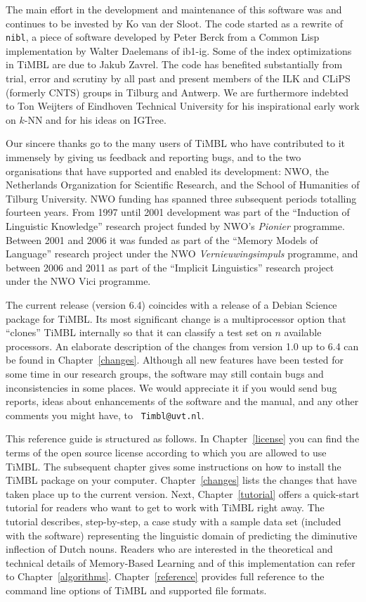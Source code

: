 \documentclass{book}
\begin{document}
The main effort in the development and maintenance of this software
was and continues to be invested by Ko van der Sloot. The code started
as a rewrite of {\tt nibl}, a piece of software developed by Peter
Berck from a Common Lisp implementation by Walter Daelemans of {\sc
  ib1-ig}. Some of the index optimizations in TiMBL are due to Jakub
Zavrel. The code has benefited substantially from trial, error and
scrutiny by all past and present members of the ILK and CLiPS
(formerly CNTS) groups in Tilburg and Antwerp. We are furthermore
indebted to Ton Weijters of Eindhoven Technical University for his
inspirational early work on $k$-NN and for his ideas on {\sc IGTree}.

Our sincere thanks go to the many users of TiMBL who have contributed
to it immensely by giving us feedback and reporting bugs, and to the
two organisations that have supported and enabled its development:
NWO, the Netherlands Organization for Scientific Research, and the
School of Humanities of Tilburg University. NWO funding has spanned
three subsequent periods totalling fourteen years. From 1997 until 2001
development was part of the ``Induction of Linguistic Knowledge''
research project funded by NWO's {\em Pionier}\/ programme. Between
2001 and 2006 it was funded as part of the ``Memory Models of
Language'' research project under the NWO {\em Vernieuwingsimpuls}\/
programme, and between 2006 and 2011 as part of the ``Implicit
Linguistics'' research project under the NWO Vici programme.

The current release (version 6.4) coincides with a release of a Debian
Science package for TiMBL. Its most significant change is a
multiprocessor option that ``clones'' TiMBL internally so that it can
classify a test set on $n$ available processors. An elaborate
description of the changes from version 1.0 up to 6.4 can be found in
Chapter~\ref{changes}.  Although all new features have been tested for
some time in our research groups, the software may still contain bugs
and inconsistencies in some places. We would appreciate it if you
would send bug reports, ideas about enhancements of the software and
the manual, and any other comments you might have, to {\tt
  Timbl@uvt.nl}.

This reference guide is structured as follows. In
Chapter~\ref{license} you can find the terms of the open source
license according to which you are allowed to use TiMBL. The
subsequent chapter gives some instructions on how to install the TiMBL
package on your computer. Chapter~\ref{changes} lists the changes that
have taken place up to the current version. Next,
Chapter~\ref{tutorial} offers a quick-start tutorial for readers who
want to get to work with TiMBL right away. The tutorial describes,
step-by-step, a case study with a sample data set (included with the
software) representing the linguistic domain of predicting the
diminutive inflection of Dutch nouns.  Readers who are interested in
the theoretical and technical details of Memory-Based Learning and of
this implementation can refer to
Chapter~\ref{algorithms}. Chapter~\ref{reference} provides full
reference to the command line options of TiMBL and supported file
formats.
\end{document}
